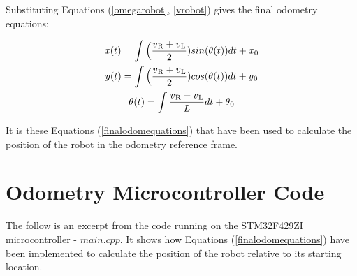 Substituting Equations (\ref{omegarobot}, \ref{vrobot}) gives the final odometry equations:

\begin{equation}\label{finalodomequations}
\begin{gathered}
    x(t) = \int \Big(\frac{v\textsubscript{R} + v\textsubscript{L}}{2}) sin(\theta(t))dt + x\textsubscript{0}
    \\
    y(t) = \int \Big(\frac{v\textsubscript{R} + v\textsubscript{L}}{2}) cos(\theta(t))dt + y\textsubscript{0}
    \\
    \theta(t) = \int \frac{v\textsubscript{R} - v\textsubscript{L}}{L}dt + \theta\textsubscript{0}
\end{gathered}
\end{equation}

It is these Equations (\ref{finalodomequations}) that have been used to calculate the position of the robot in the odometry reference frame.


\section{Odometry Microcontroller Code}

The follow is an excerpt from the code running on the STM32F429ZI microcontroller - $main.cpp$. It shows how Equations (\ref{finalodomequations}) have been implemented to calculate the position of the robot relative to its starting location.

